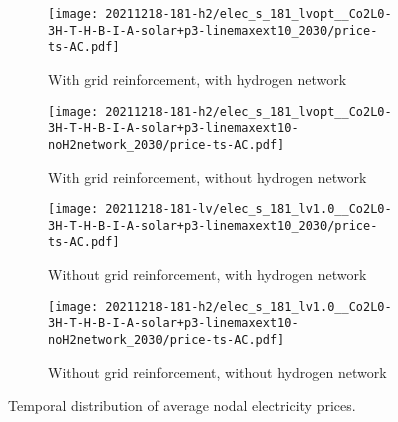 \begin{figure}
    \begin{subfigure}{0.49\textwidth}
        \centering
        \caption{With grid reinforcement, with hydrogen network}
        \texttt{[image: 20211218-181-h2/elec\_s\_181\_lvopt\_\_Co2L0-3H-T-H-B-I-A-solar+p3-linemaxext10\_2030/price-ts-AC.pdf]}
    \end{subfigure}
    \begin{subfigure}{0.49\textwidth}
        \centering
        \caption{With grid reinforcement, without hydrogen network}
        \texttt{[image: 20211218-181-h2/elec\_s\_181\_lvopt\_\_Co2L0-3H-T-H-B-I-A-solar+p3-linemaxext10-noH2network\_2030/price-ts-AC.pdf]}
    \end{subfigure}
    \begin{subfigure}{0.49\textwidth}
        \centering
        \caption{Without grid reinforcement, with hydrogen network}
        \texttt{[image: 20211218-181-lv/elec\_s\_181\_lv1.0\_\_Co2L0-3H-T-H-B-I-A-solar+p3-linemaxext10\_2030/price-ts-AC.pdf]}
    \end{subfigure}
    \begin{subfigure}{0.49\textwidth}
        \centering
        \caption{Without grid reinforcement, without hydrogen network}
        \texttt{[image: 20211218-181-h2/elec\_s\_181\_lv1.0\_\_Co2L0-3H-T-H-B-I-A-solar+p3-linemaxext10-noH2network\_2030/price-ts-AC.pdf]}
    \end{subfigure}
    \caption{Temporal distribution of average nodal electricity prices.}
    \label{fig:si:lmp-ts-ac}
\end{figure}


